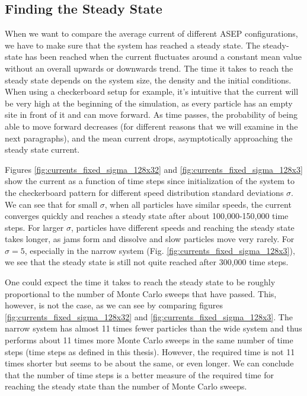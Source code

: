 \subsection{Finding the Steady State}

When we want to compare the average current of different ASEP configurations, we have to make sure that the system has reached a steady state. The steady-state has been reached when the current fluctuates around a constant mean value without an overall upwards or downwards trend. The time it takes to reach the steady state depends on the system size, the density and the initial conditions. When using a checkerboard setup for example, it's intuitive that the current will be very high at the beginning of the simulation, as every particle has an empty site in front of it and can move forward. As time passes, the probability of being able to move forward decreases (for different reasons that we will examine in the next paragraphs), and the mean current drops, asymptotically approaching the steady state current.


Figures \ref{fig:currents_fixed_sigma_128x32} and \ref{fig:currents_fixed_sigma_128x3} show the current as a function of time steps since initialization of the system to the checkerboard pattern for different speed distribution standard deviations $\sigma$. We can see that for small $\sigma$, when all particles have similar speeds, the current converges quickly and reaches a steady state after about 100,000-150,000 time steps. For larger $\sigma$, particles have different speeds and reaching the steady state takes longer, as jams form and dissolve and slow particles move very rarely. For $\sigma = 5$, especially in the narrow system (Fig. \ref{fig:currents_fixed_sigma_128x3}), we see that the steady state is still not quite reached after 300,000 time steps. 


One could expect the time it takes to reach the steady state to be roughly proportional to the number of Monte Carlo sweeps that have passed. This, however, is not the case, as we can see by comparing figures \ref{fig:currents_fixed_sigma_128x32} and \ref{fig:currents_fixed_sigma_128x3}. The narrow system has almost 11 times fewer particles than the wide system and thus performs about 11 times more Monte Carlo sweeps in the same number of time steps (time steps as defined in this thesis). However, the required time is not 11 times shorter but seems to be about the same, or even longer. We can conclude that the number of time steps is a better measure of the  required time for reaching the steady state than the number of Monte Carlo sweeps.


